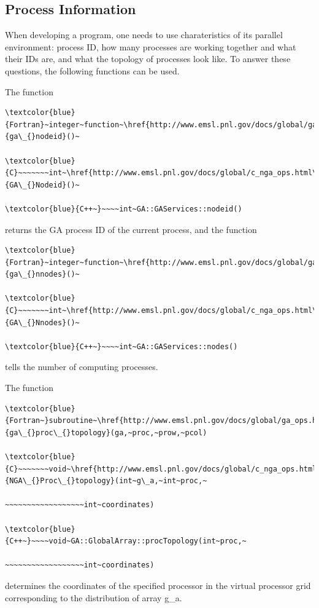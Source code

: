 \subsection{Process Information }

When developing a program, one needs to use charateristics of its
parallel environment: process ID, how many processes are working together
and what their IDs are, and what the topology of processes look like.
To answer these questions, the following functions can be used.

The function
\begin{verbatim}
\textcolor{blue}{Fortran}~integer~function~\href{http://www.emsl.pnl.gov/docs/global/ga_ops.html\#ga_nodeid}{ga\_{}nodeid}()~

\textcolor{blue}{C}~~~~~~~int~\href{http://www.emsl.pnl.gov/docs/global/c_nga_ops.html\#ga_nodeid}{GA\_{}Nodeid}()~

\textcolor{blue}{C++~}~~~~int~GA::GAServices::nodeid()
\end{verbatim}
returns the GA process ID of the current process, and the function
\begin{verbatim}
\textcolor{blue}{Fortran}~integer~function~\href{http://www.emsl.pnl.gov/docs/global/ga_ops.html\#ga_nnodes}{ga\_{}nnodes}()~

\textcolor{blue}{C}~~~~~~~int~\href{http://www.emsl.pnl.gov/docs/global/c_nga_ops.html\#ga_nnodes}{GA\_{}Nnodes}()~

\textcolor{blue}{C++~}~~~~int~GA::GAServices::nodes()
\end{verbatim}
tells the number of computing processes.

The function
\begin{verbatim}
\textcolor{blue}{Fortran~}subroutine~\href{http://www.emsl.pnl.gov/docs/global/ga_ops.html\#ga_proc_topology}{ga\_{}proc\_{}topology}(ga,~proc,~prow,~pcol)

\textcolor{blue}{C}~~~~~~~void~\href{http://www.emsl.pnl.gov/docs/global/c_nga_ops.html\#ga_proc_topology}{NGA\_{}Proc\_{}topology}(int~g\_a,~int~proc,~

~~~~~~~~~~~~~~~~~~int~coordinates)

\textcolor{blue}{C++~}~~~~void~GA::GlobalArray::procTopology(int~proc,~

~~~~~~~~~~~~~~~~~~int~coordinates)
\end{verbatim}
determines the coordinates of the specified processor in the virtual
processor grid corresponding to the distribution of array g\_a.

